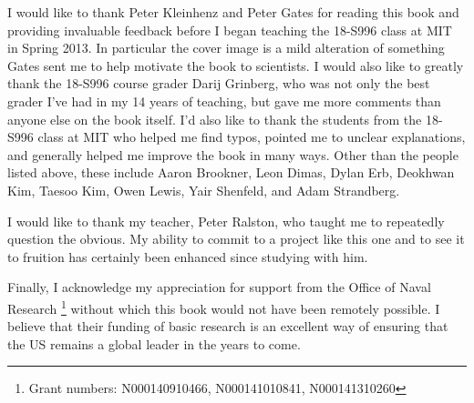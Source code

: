 \documentclass[../main/CT4S-EN-RU]{subfiles}
\begin{document}
\begin{blockRUS}
\end{blockRUS}

\begin{blockENG}
I would like to thank Peter Kleinhenz and Peter Gates for reading this book and providing invaluable feedback before I began teaching the 18-S996 class at MIT in Spring 2013. In particular the cover image is a mild alteration of something Gates sent me to help motivate the book to scientists. I would also like to greatly thank the 18-S996 course grader Darij Grinberg, who was not only the best grader I've had in my 14 years of teaching, but gave me more comments than anyone else on the book itself. I'd also like to thank the students from the 18-S996 class at MIT who helped me find typos, pointed me to unclear explanations, and generally helped me improve the book in many ways. Other than the people listed above, these include Aaron Brookner, Leon Dimas, Dylan Erb, Deokhwan Kim, Taesoo Kim, Owen Lewis, Yair Shenfeld, and Adam Strandberg.
\end{blockENG}

\begin{blockRUS}
\end{blockRUS}

\begin{blockENG}
I would like to thank my teacher, Peter Ralston, who taught me to repeatedly question the obvious. My ability to commit to a project like this one and to see it to fruition has certainly been enhanced since studying with him.
\end{blockENG}

\begin{blockRUS}
\end{blockRUS}

\begin{blockENG}
Finally, I acknowledge my appreciation for support from the Office of Naval Research%
\footnote{Grant numbers: N000140910466, N000141010841, N000141310260}
without which this book would not have been remotely possible. I believe that their funding of basic research is an excellent way of ensuring that the US remains a global leader in the years to come.
\end{blockENG}

\begin{blockRUS}
\end{blockRUS}
\end{document}
